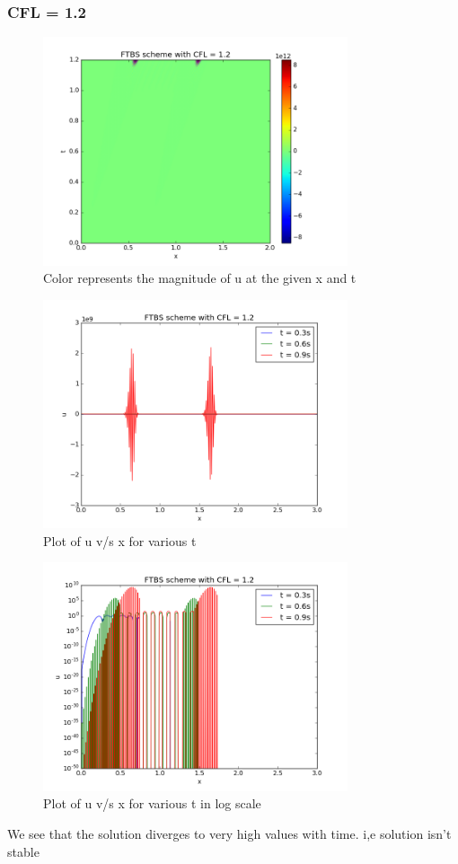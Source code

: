\documentclass[11pt, a4paper]{article}
\begin{document}
\subsubsection{CFL = 1.2}
\begin{figure}[H]
 \centering
 \includegraphics[width = 0.8\textwidth]{FTBS3_12.png}
 \caption{Color represents the magnitude of u at the given x and t}
\end{figure}

\begin{figure}[H]
 \centering
 \includegraphics[width = 0.8\textwidth]{FTBS3_12_1.png}
 \caption{Plot of u v/s x for various t}
\end{figure}

\begin{figure}[H]
 \centering
 \includegraphics[width = 0.8\textwidth]{FTBS3_12_1_log.png}
 \caption{Plot of u v/s x for various t in log scale}
\end{figure}
We see that the solution diverges to very high values with time. i,e solution isn't stable
\end{document}

